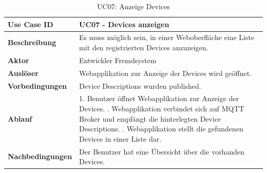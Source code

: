 \begin{table}[H]
\begin{tabularx}{\textwidth}{|l|X|}

 \hline
 {\bf Use Case ID }    & UC07 - Devices anzeigen \\  \hline
 {\bf Beschreibung }   & Es muss möglich sein, in einer Weboberfläche eine Liste mit den registrierten Devices anzuzeigen. \\ \hline
 {\bf Aktor }          & Entwickler Fremdsystem \\ \hline
 {\bf Auslöser }       & Webapplikation zur Anzeige der Devices wird geöffnet. \\ \hline
 {\bf Vorbedingungen } & Device Descriptions wurden published. \\ \hline
 {\bf Ablauf }         & 
     1. Benutzer öffnet Webapplikation zur Anzeige der Devices. \newline
     2. Webapplikation verbindet sich auf MQTT Broker und empfängt die hinterlegten Device Descriptions. \newline
     3. Webapplikation stellt die gefundenen Devices in einer Liste dar. \\ \hline
 {\bf Nachbedingungen} & Der Benutzer hat eine Übersicht über die vorhanden Devices. \\ \hline
  
\end{tabularx}
\caption{UC07: Anzeige Devices}
\end{table}

